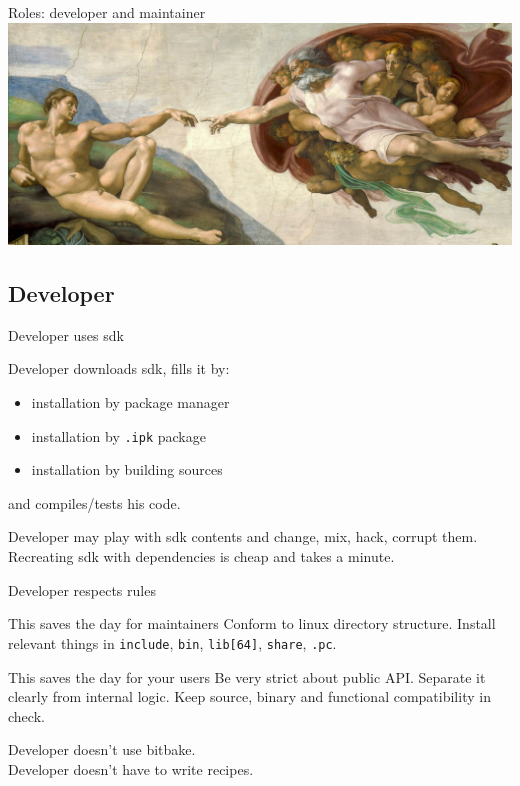 \documentclass{beamer}
\begin{document}
\begin{frame}{Roles: developer and maintainer}
    \centering
    \includegraphics[width=\linewidth]{img/Michelangelo_-_The_Creation_of_Adam.jpg}
\end{frame}

\subsection{Developer}

\begin{frame}[fragile]{Developer uses sdk}
    \begin{block}{}
        Developer downloads sdk, fills it by:
        \begin{itemize}
            \item installation by package manager
            \item installation by \verb|.ipk| package
            \item installation by building sources
        \end{itemize}
        and compiles/tests his code.
    \end{block}
    \begin{block}{}
        \color{green!60!black}
        Developer may play with sdk contents and change, mix, hack, corrupt them.
        Recreating sdk with dependencies is cheap and takes a minute.
    \end{block}
\end{frame}

\begin{frame}[fragile]{Developer respects rules}
    \begin{block}{This saves the day for maintainers}
        Conform to linux directory structure.
        Install relevant things in \verb|include|, \verb|bin|,
        \verb|lib[64]|, \verb|share|, \verb|.pc|.
    \end{block}
    \begin{block}{This saves the day for your users}
        Be very strict about public API.
        Separate it clearly from internal logic.
        Keep source, binary and functional compatibility in check.
    \end{block}
    \begin{block}{}
        \color{red!60!black}
        Developer doesn't use bitbake. \\
        Developer doesn't have to write recipes.
    \end{block}
\end{frame}
\end{document}

